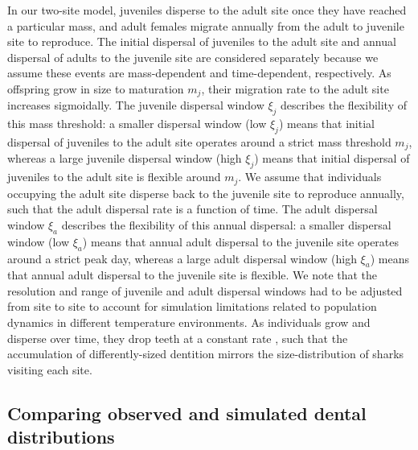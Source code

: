 \documentclass[]{rsos}%
\begin{document}
In our two-site model, juveniles disperse to the adult site once they have reached a particular mass, and adult females migrate annually from the adult to juvenile site to reproduce.
The initial dispersal of juveniles to the adult site and annual dispersal of adults to the juvenile site are considered separately because we assume these events are mass-dependent and time-dependent, respectively.
As offspring grow in size to maturation $m_j$, their migration rate to the adult site increases sigmoidally.
The juvenile dispersal window $\xi_j$ describes the flexibility of this mass threshold: a smaller dispersal window (low $\xi_j$) means that initial dispersal of juveniles to the adult site operates around a strict mass threshold $m_j$, whereas a large juvenile dispersal window (high $\xi_j$) means that initial dispersal of juveniles to the adult site is flexible around $m_j$.
We assume that individuals occupying the adult site disperse back to the juvenile site to reproduce annually, such that the adult dispersal rate is a function of time.
The adult dispersal window $\xi_a$ describes the flexibility of this annual dispersal: a smaller dispersal window (low $\xi_a$) means that annual adult dispersal to the juvenile site operates around a strict peak day, whereas a large adult dispersal window (high $\xi_a$) means that annual adult dispersal to the juvenile site is flexible.
We note that the resolution and range of juvenile and adult dispersal windows had to be adjusted from site to site to account for simulation limitations related to population dynamics in different temperature environments.
As individuals grow and disperse over time, they drop teeth at a constant rate \cite{zeichner2017discrimination}, such that the accumulation of differently-sized dentition mirrors the size-distribution of sharks visiting each site.


\subsection{Comparing observed and simulated dental distributions}
\end{document}
